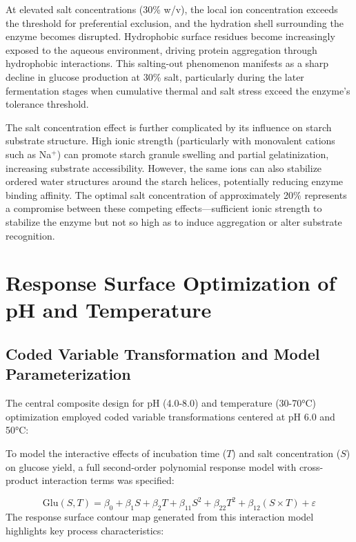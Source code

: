 \documentclass[
  12pt,
]{article}
\begin{document}
At elevated salt concentrations (30\% w/v), the local ion concentration
exceeds the threshold for preferential exclusion, and the hydration
shell surrounding the enzyme becomes disrupted. Hydrophobic surface
residues become increasingly exposed to the aqueous environment, driving
protein aggregation through hydrophobic interactions. This salting-out
phenomenon manifests as a sharp decline in glucose production at 30\%
salt, particularly during the later fermentation stages when cumulative
thermal and salt stress exceed the enzyme's tolerance threshold.

The salt concentration effect is further complicated by its influence on
starch substrate structure. High ionic strength (particularly with
monovalent cations such as Na\(^{+}\)) can promote starch granule
swelling and partial gelatinization, increasing substrate accessibility.
However, the same ions can also stabilize ordered water structures
around the starch helices, potentially reducing enzyme binding affinity.
The optimal salt concentration of approximately 20\% represents a
compromise between these competing effects---sufficient ionic strength
to stabilize the enzyme but not so high as to induce aggregation or
alter substrate recognition.

\section{Response Surface Optimization of pH and
Temperature}\label{response-surface-optimization-of-ph-and-temperature}

\subsection{Coded Variable Transformation and Model
Parameterization}\label{coded-variable-transformation-and-model-parameterization}

The central composite design for pH (4.0-8.0) and temperature (30-70°C)
optimization employed coded variable transformations centered at pH 6.0
and 50°C:

To model the interactive effects of incubation time (\(T\)) and salt
concentration (\(S\)) on glucose yield, a full second-order polynomial
response model with cross-product interaction terms was specified:

\[\text{Glu}(S, T) = \beta_0 + \beta_1 S + \beta_2 T + \beta_{11} S^2 + \beta_{22} T^2 + \beta_{12} (S \times T) + \varepsilon\]
The response surface contour map generated from this interaction model
highlights key process characteristics:
\end{document}

